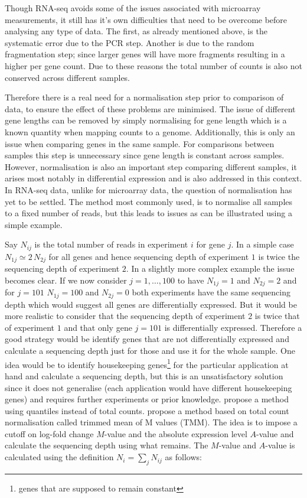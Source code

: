 Though RNA-seq avoids some of the issues associated with microarray measurements, it still has it's own difficulties that need to be overcome before analysing any type of data. The first, as already mentioned above, is the systematic error due to the PCR step. Another is due to the random fragmentation step; since larger genes will have more fragments resulting in a higher per gene count. Due to these reasons the total number of counts is also not conserved across different samples.

Therefore there is a real need for a normalisation step prior to comparison of data, to ensure the effect of these problems are minimised. The issue of different gene lengths can be removed by simply normalising for gene length which is a known quantity when  mapping counts to a genome. Additionally, this is only an issue when comparing genes in the same sample. For comparisons between samples this step is unnecessary since gene length is constant across samples. However, normalisation is also an important step comparing different samples, it arises most notably in differential expression and is also addressed in this context. In RNA-seq data, unlike for microarray data, the question of normalisation has yet to be settled. The method most commonly used, is to normalise all samples to a fixed number of reads, but this leads to issues as can be illustrated using a simple example.

Say $N_{ij}$ is the total number of reads in experiment $i$ for gene $j$. In a simple case $N_{1j} \simeq 2 \, N_{2j}$ for all genes and hence sequencing depth of experiment $1$ is twice the sequencing depth of experiment $2$. In a slightly more complex example the issue becomes clear. If we now consider $j = 1, \ldots,  100$ to have $N_{1j} = 1$ and $N_{2j} = 2$ and for $j = 101$ $N_{1j} = 100$ and $N_{2j} = 0$ both experiments have the same sequencing depth which would suggest all genes are differentially expressed. But it would be more realistic to consider that the sequencing depth of experiment $2$ is twice that of experiment $1$ and that only gene $j = 101$ is differentially expressed. Therefore a good strategy would be identify genes that are not differentially expressed and calculate a sequencing depth just for those and use it for the whole sample. One idea would be to identify housekeeping genes\footnote{genes that are supposed to remain constant} for the particular application at hand and calculate a sequencing depth, but this is an unsatisfactory solution since it does not generalise (each application would have different housekeeping genes) and requires further experiments or prior knowledge. \cite{Bullard:2010go} propose a method using quantiles instead of total counts. \cite{Robinson:2010dd} propose a method based on total count normalisation called trimmed mean of M values (TMM). The idea is to impose a cutoff on log-fold change $M$-value and the absolute expression level $A$-value and calculate the sequencing depth using what remains. The $M$-value  and $A$-value is calculated using the definition $N_i = \sum_j N_{ij} $ as follows:

